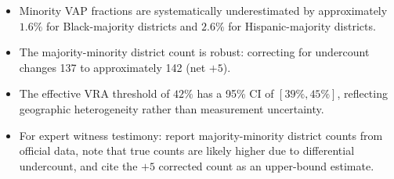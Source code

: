 \begin{itemize}
  \item Minority VAP fractions are systematically underestimated by
    approximately $1.6\%$ for Black-majority districts and $2.6\%$
    for Hispanic-majority districts.
  \item The majority-minority district count is robust: correcting
    for undercount changes 137 to approximately 142 (net $+5$).
  \item The effective VRA threshold of $42\%$ has a 95\% CI of
    $[39\%, 45\%]$, reflecting geographic heterogeneity rather than
    measurement uncertainty.
  \item For expert witness testimony: report majority-minority district
    counts from official data, note that true counts are likely higher
    due to differential undercount, and cite the $+5$ corrected count
    as an upper-bound estimate.
\end{itemize}
